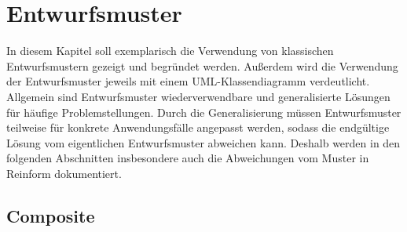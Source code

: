 \chapter{Entwurfsmuster}
\label{ch:Entwurfsmuster}

In diesem Kapitel soll exemplarisch die Verwendung von klassischen Entwurfsmustern gezeigt und begründet werden.
Außerdem wird die Verwendung der Entwurfsmuster jeweils mit einem UML-Klassendiagramm verdeutlicht.
\newline
Allgemein sind Entwurfsmuster wiederverwendbare und generalisierte Lösungen für häufige Problemstellungen.
Durch die Generalisierung müssen Entwurfsmuster teilweise für konkrete Anwendungsfälle angepasst werden, sodass die endgültige Lösung vom eigentlichen Entwurfsmuster abweichen kann.
Deshalb werden in den folgenden Abschnitten insbesondere auch die Abweichungen vom Muster in Reinform dokumentiert. 

\section{Composite}


